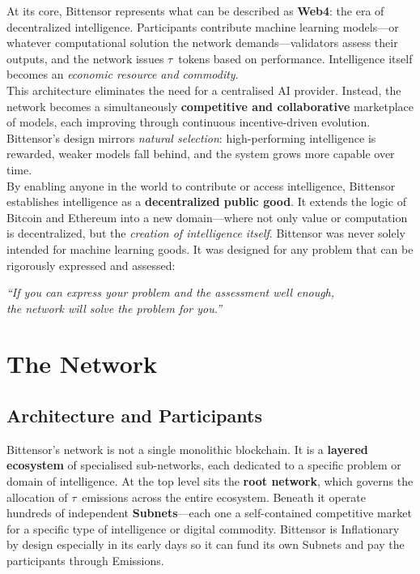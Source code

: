 \documentclass[12pt, a4paper, oneside]{report}
\newcommand{\TAO}{$\tau$}            %
\theoremstyle{definition}
\begin{document}
At its core, Bittensor represents what can be described as \textbf{Web4}: the era of 
decentralized intelligence. Participants contribute machine learning models—or whatever 
computational solution the network demands—validators assess their outputs, and the 
network issues \TAO\ tokens based on performance. Intelligence itself becomes an 
\emph{economic resource and commodity}.\\[0.4cm]

This architecture eliminates the need for a centralised AI provider. Instead, the 
network becomes a simultaneously \textbf{competitive and collaborative} marketplace 
of models, each improving through continuous incentive-driven evolution. Bittensor's 
design mirrors \emph{natural selection}: high-performing intelligence is rewarded, 
weaker models fall behind, and the system grows more capable over time.\\[0.4cm]

By enabling anyone in the world to contribute or access intelligence, Bittensor 
establishes intelligence as a \textbf{decentralized public good}. It extends the logic 
of Bitcoin and Ethereum into a new domain—where not only value or computation is 
decentralized, but the \emph{creation of intelligence itself}. Bittensor was never 
solely intended for machine learning goods. It was designed for any problem that can 
be rigorously expressed and assessed:

\begin{center}
\textit{``If you can express your problem and the assessment well enough,}\\
\textit{the network will solve the problem for you.''}
\end{center}







\section{The Network}
\label{sec:network}

\subsection{Architecture and Participants}

Bittensor's network is not a single monolithic blockchain. It is a \textbf{layered 
ecosystem} of specialised sub-networks, each dedicated to a specific problem or 
domain of intelligence. At the top level sits the \textbf{root network}, which 
governs the allocation of \TAO\ emissions across the entire ecosystem. Beneath it 
operate hundreds of independent \textbf{Subnets}—each one a self-contained 
competitive market for a specific type of intelligence or digital commodity. Bittensor is Inflationary by design especially in its early days so it can fund its own Subnets and pay the participants through Emissions.\\[0.4cm]
\end{document}
